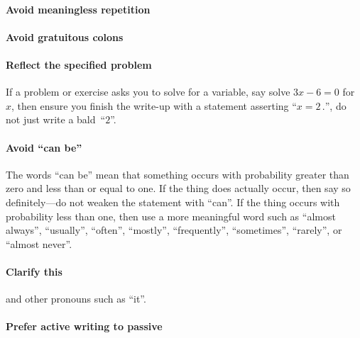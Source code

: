 \begin{draft}
\paragraph{Avoid meaningless repetition}



\paragraph{Avoid gratuitous colons}



\paragraph{Reflect the specified problem}
If a problem or exercise asks you to solve for a variable, say solve  \(3x-6=0\) for~\(x\), then ensure you finish the write-up with a statement asserting ``\(x=2\,.\)'', do not just write a bald~``\(2\)''.



\paragraph{Avoid ``can be''}
The words ``can be'' mean that something occurs with probability greater than zero and less than or equal to one.
If the thing does actually occur, then say so definitely---do not weaken the statement with ``can''.
If the thing occurs with probability less than one, then use a more meaningful word such as ``almost always'', ``usually'', ``often'', ``mostly'', ``frequently'', ``sometimes'', ``rarely'',  or ``almost never''.



\paragraph{Clarify this}
and other pronouns such as ``it''.




\paragraph{Prefer active writing to passive}








\sectionExercises

\end{draft}
